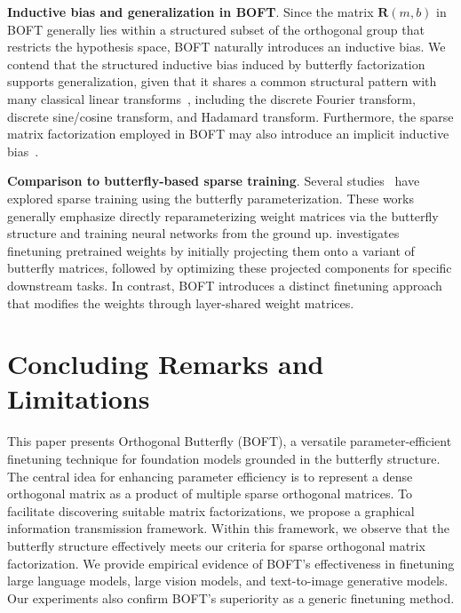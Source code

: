 \textbf{Inductive bias and generalization in BOFT}. Since the matrix $\bm{R}(m,b)$ in BOFT generally lies within a structured subset of the orthogonal group that restricts the hypothesis space, BOFT naturally introduces an inductive bias. We contend that the structured inductive bias induced by butterfly factorization supports generalization, given that it shares a common structural pattern with many classical linear transforms~\cite{dao2019kaleidoscope}, including the discrete Fourier transform, discrete sine/cosine transform, and Hadamard transform. Furthermore, the sparse matrix factorization employed in BOFT may also introduce an implicit inductive bias~\cite{gunasekar2017implicit,li2018algorithmic,liu2019neural}.

\textbf{Comparison to butterfly-based sparse training}. Several studies~\cite{dao2019learning,dao2019kaleidoscope,chen2022pixelated,dao2022monarch} have explored sparse training using the butterfly parameterization. These works generally emphasize directly reparameterizing weight matrices via the butterfly structure and training neural networks from the ground up. \cite{dao2022monarch} investigates finetuning pretrained weights by initially projecting them onto a variant of butterfly matrices, followed by optimizing these projected components for specific downstream tasks. In contrast, BOFT introduces a distinct finetuning approach that modifies the weights through layer-shared weight matrices.



\section{Concluding Remarks and Limitations}

This paper presents Orthogonal Butterfly (BOFT), a versatile parameter-efficient finetuning technique for foundation models grounded in the butterfly structure. The central idea for enhancing parameter efficiency is to represent a dense orthogonal matrix as a product of multiple sparse orthogonal matrices. To facilitate discovering suitable matrix factorizations, we propose a graphical information transmission framework. Within this framework, we observe that the butterfly structure effectively meets our criteria for sparse orthogonal matrix factorization. We provide empirical evidence of BOFT's effectiveness in finetuning large language models, large vision models, and text-to-image generative models. Our experiments also confirm BOFT’s superiority as a generic finetuning method.

